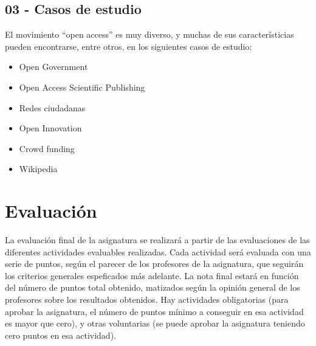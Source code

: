 \documentclass[a4paper,12pt]{article}
\begin{document}
\subsection{03 - Casos de estudio}

El movimiento ``open access'' es muy diverso, y muchas de sus característicias pueden encontrarse, entre otros, en los siguientes casos de estudio:

\begin{itemize}
\item Open Government
\item Open Access Scientific Publishing
\item Redes ciudadanas
\item Open Innovation
\item Crowd funding
\item Wikipedia
\end{itemize}

\section{Evaluación}

La evaluación final de la asignatura se realizará a partir de las evaluaciones de las diferentes actividades evaluables realizadas. Cada actividad será evaluada con una serie de puntos, según el parecer de los profesores de la asignatura, que seguirán los criterios generales espeficados más adelante. La nota final estará en función del número de puntos total obtenido, matizados según la opinión general de los profesores sobre los resultados obtenidos. Hay actividades obligatorias (para aprobar la asignatura, el número de puntos mínimo a conseguir en esa actividad es mayor que cero), y otras voluntarias (se puede aprobar la asignatura teniendo cero puntos en esa actividad).

\end{document}
